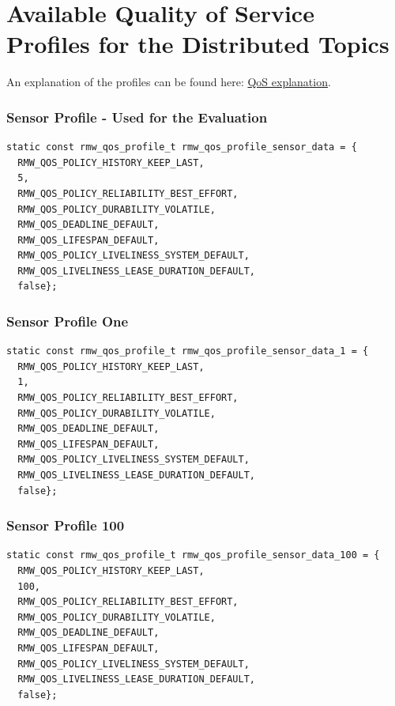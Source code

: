
\Appendix
\label{ch:Appendix}
\section{Available Quality of Service Profiles for the Distributed Topics}\label{sec:app-qos}
An explanation of the profiles can be found here: \href{https://docs.ros.org/en/rolling/Concepts/Intermediate/About-Quality-of-Service-Settings.html}{QoS explanation}.
\subsubsection*{Sensor Profile - Used for the Evaluation}
\lstset{language=C++,basicstyle=\scriptsize}
\begin{lstlisting}[caption=Sensor data profile.,label=ca_code_qos_sensor_profile]
static const rmw_qos_profile_t rmw_qos_profile_sensor_data = {
  RMW_QOS_POLICY_HISTORY_KEEP_LAST,
  5,
  RMW_QOS_POLICY_RELIABILITY_BEST_EFFORT,
  RMW_QOS_POLICY_DURABILITY_VOLATILE,
  RMW_QOS_DEADLINE_DEFAULT,
  RMW_QOS_LIFESPAN_DEFAULT,
  RMW_QOS_POLICY_LIVELINESS_SYSTEM_DEFAULT,
  RMW_QOS_LIVELINESS_LEASE_DURATION_DEFAULT,
  false};
\end{lstlisting}
\subsubsection*{Sensor Profile One}
\begin{lstlisting}[caption=Sensor data profile with history of 1.,label=ca_code_qos_sensor_1_profile]
static const rmw_qos_profile_t rmw_qos_profile_sensor_data_1 = {
  RMW_QOS_POLICY_HISTORY_KEEP_LAST,
  1,
  RMW_QOS_POLICY_RELIABILITY_BEST_EFFORT,
  RMW_QOS_POLICY_DURABILITY_VOLATILE,
  RMW_QOS_DEADLINE_DEFAULT,
  RMW_QOS_LIFESPAN_DEFAULT,
  RMW_QOS_POLICY_LIVELINESS_SYSTEM_DEFAULT,
  RMW_QOS_LIVELINESS_LEASE_DURATION_DEFAULT,
  false};
\end{lstlisting}
\subsubsection*{Sensor Profile 100}
\begin{lstlisting}[caption=Sensor data profile with history of 100.,label=ca_code_qos_sensor_1_profile]
static const rmw_qos_profile_t rmw_qos_profile_sensor_data_100 = {
  RMW_QOS_POLICY_HISTORY_KEEP_LAST,
  100,
  RMW_QOS_POLICY_RELIABILITY_BEST_EFFORT,
  RMW_QOS_POLICY_DURABILITY_VOLATILE,
  RMW_QOS_DEADLINE_DEFAULT,
  RMW_QOS_LIFESPAN_DEFAULT,
  RMW_QOS_POLICY_LIVELINESS_SYSTEM_DEFAULT,
  RMW_QOS_LIVELINESS_LEASE_DURATION_DEFAULT,
  false};
\end{lstlisting}
